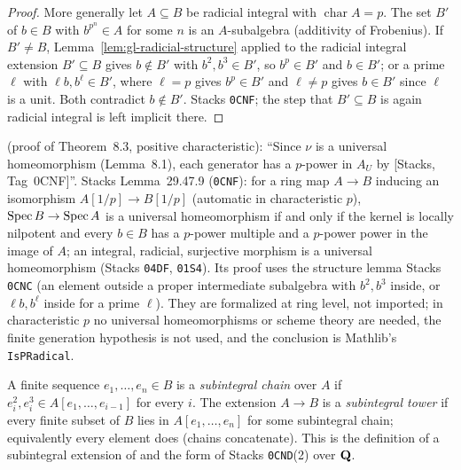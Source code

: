 \begin{proof}
More generally let $A\subseteq B$ be radicial integral with $\operatorname{char}A=p$. The set $B'$ of $b\in B$ with $b^{p^n}\in A$ for some $n$ is an $A$-subalgebra
(additivity of Frobenius). If $B'\ne B$, Lemma~\ref{lem:gl-radicial-structure} applied to the radicial integral extension $B'\subseteq B$ gives $b\notin B'$ with
$b^2,b^3\in B'$, so $b^{p}\in B'$ and $b\in B'$; or a prime $\ell$ with $\ell b,b^\ell\in B'$, where $\ell=p$ gives $b^p\in B'$ and $\ell\ne p$ gives $b\in B'$ since $\ell$
is a unit. Both contradict $b\notin B'$. Stacks \texttt{0CNF}; the step that $B'\subseteq B$ is again radicial integral is left implicit there.
\end{proof}

\begin{remark}\label{rmk:gl-frobenius-descent}
\cite{FHX} (proof of Theorem~8.3, positive characteristic): ``Since $\nu$ is a universal homeomorphism (Lemma~8.1), each generator has a $p$-power in $A_U$ by
[Stacks, Tag~0CNF]''. Stacks Lemma~29.47.9 (\texttt{0CNF}): for a ring map $A\to B$ inducing an isomorphism $A[1/p]\to B[1/p]$ (automatic in characteristic $p$),
$\operatorname{Spec} B\to\operatorname{Spec} A$ is a universal homeomorphism if and only if the kernel is locally nilpotent and every $b\in B$ has a $p$-power multiple and a $p$-power power in
the image of $A$; an integral, radicial, surjective morphism is a universal homeomorphism (Stacks \texttt{04DF}, \texttt{01S4}). Its proof uses the structure lemma
Stacks \texttt{0CNC} (an element outside a proper intermediate subalgebra with $b^2,b^3$ inside, or $\ell b,b^\ell$ inside for a prime $\ell$). They are formalized at ring level, not
imported; in characteristic $p$ no universal homeomorphisms or scheme theory are needed, the finite generation hypothesis is not used, and the conclusion is
Mathlib's \texttt{IsPRadical}.
\end{remark}

\begin{definition}\label{def:gl-subintegral-tower}
\leanok
A finite sequence $e_1,\dots,e_n\in B$ is a \emph{subintegral chain} over $A$ if $e_i^2,e_i^3\in A[e_1,\dots,e_{i-1}]$ for every $i$. The extension $A\to B$ is
a \emph{subintegral tower} if every finite subset of $B$ lies in $A[e_1,\dots,e_n]$ for some subintegral chain; equivalently every element does
(chains concatenate). This is the definition of a subintegral extension of \cite[\S4]{RobertsSingh} and the form of Stacks \texttt{0CND}(2) over $\mathbf{Q}$.
\end{definition}

